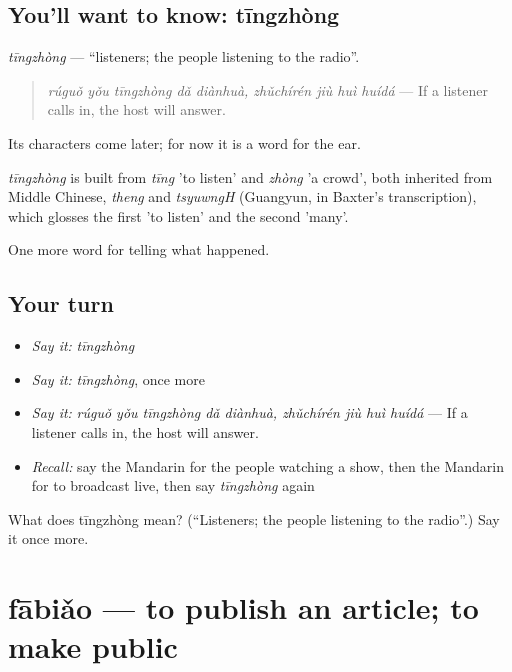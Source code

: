 \subsection*{You'll want to know: tīngzhòng}
\emph{tīngzhòng} — \textquotedblleft{}listeners; the people listening to the radio\textquotedblright{}.

\begin{quote}
\emph{rúguǒ yǒu tīngzhòng dǎ diànhuà, zhǔchírén jiù huì huídá} — If a listener calls in, the host will answer.
\end{quote}

Its characters come later; for now it is a word for the ear.

\begin{cousinweb}
\emph{tīngzhòng} is built from \emph{tīng} 'to listen' and \emph{zhòng} 'a crowd', both inherited from Middle Chinese, \emph{theng} and \emph{tsyuwngH} (Guangyun, in Baxter's transcription), which glosses the first 'to listen' and the second 'many'.
\end{cousinweb}

\begin{grammarlens}[title={What you've built}]
One more word for telling what happened.
\end{grammarlens}

\subsection*{Your turn}
\begin{itemize}
\raggedright
  \item \emph{Say it:} \emph{tīngzhòng}
  \item \emph{Say it:} \emph{tīngzhòng}, once more
  \item \emph{Say it:} \emph{rúguǒ yǒu tīngzhòng dǎ diànhuà, zhǔchírén jiù huì huídá} — If a listener calls in, the host will answer.
  \item \emph{Recall:} say the Mandarin for the people watching a show, then the Mandarin for to broadcast live, then say \emph{tīngzhòng} again
\end{itemize}

\begin{tcolorbox}[breakable,colback=teal!4,colframe=teal!35!black,title={Before you move on}]
What does tīngzhòng mean? (\textquotedblleft{}Listeners; the people listening to the radio\textquotedblright{}.) Say it once more.
\end{tcolorbox}
\section[fābiǎo]{fābiǎo — to publish an article; to make public}

